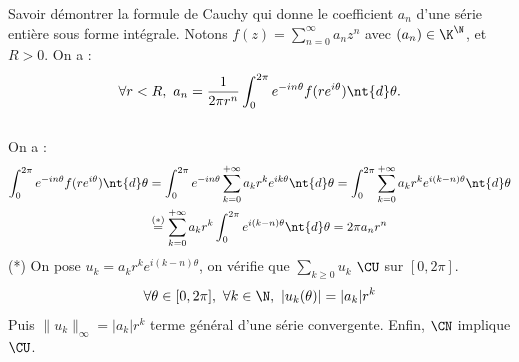 \documentclass[french, 11pt]{article}
\begin{document}
\begin{exercice}{}{}
    Savoir démontrer la formule de Cauchy qui donne le coefficient $a_n$ d'une série entière sous forme intégrale.
    \tcblower
    Notons $f(z)=\sum_{n=0}^\infty a_nz^n$ avec $(a_n)\in\K^\N$, et $R>0$. On a :
    \begin{equation*}
        \forall r < R, ~ a_n = \frac{1}{2\pi r^n} \int_0^{2\pi} e^{-in\theta} f(re^{i\theta})\nt{d}\theta.
    \end{equation*}
    \\
    On a :
    \begin{align*}
        \int_0^{2\pi}e^{-in\theta}f(re^{i\theta})\nt{d}\theta &= \int_0^{2\pi}e^{-in\theta}\sum_{k=0}^{+\infty}a_k r^ke^{ik\theta} \nt{d}\theta = \int_0^{2\pi}\sum_{k=0}^{+\infty}a_kr^ke^{i(k-n)\theta}\nt{d}\theta\\
        &\overset{(*)}{=}\sum_{k=0}^{+\infty}a_kr^k\int_0^{2\pi}e^{i(k-n)\theta}\nt{d}\theta=2\pi a_n r^n
    \end{align*}
    (*) On pose $u_k=a_kr^ke^{i(k-n)\theta}$, on vérifie que $\sum_{k\geq0}u_k$ $\CU$ sur $[0,2\pi]$.
    \begin{equation*}
        \forall \theta \in [0,2\pi], ~ \forall k \in \N, ~ |u_k(\theta)|=|a_k|r^k
    \end{equation*}
    Puis $\|u_k\|_\infty=|a_k|r^k$ terme général d'une série convergente. Enfin, $\CN$ implique $\CU$.
\end{exercice}
\end{document}
